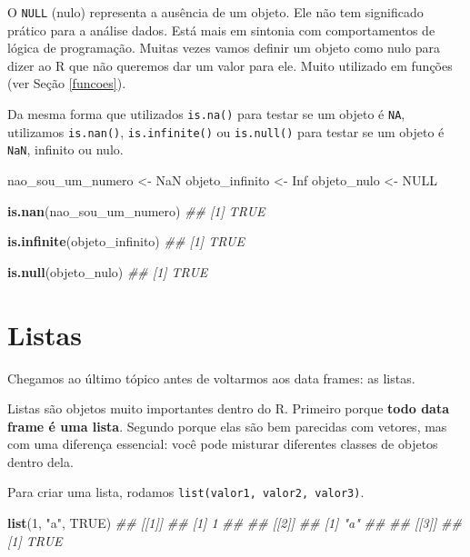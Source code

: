 \documentclass[]{book}
\newenvironment{Shaded}{\begin{snugshade}}{\end{snugshade}}
\newcommand{\CommentTok}[1]{\textcolor[rgb]{0.56,0.35,0.01}{\textit{#1}}}
\newcommand{\DecValTok}[1]{\textcolor[rgb]{0.00,0.00,0.81}{#1}}
\newcommand{\KeywordTok}[1]{\textcolor[rgb]{0.13,0.29,0.53}{\textbf{#1}}}
\newcommand{\NormalTok}[1]{#1}
\newcommand{\OtherTok}[1]{\textcolor[rgb]{0.56,0.35,0.01}{#1}}
\newcommand{\StringTok}[1]{\textcolor[rgb]{0.31,0.60,0.02}{#1}}
\begin{document}
O \texttt{NULL} (nulo) representa a ausência de um objeto. Ele não tem significado prático para a análise dados. Está mais em sintonia com comportamentos de lógica de programação. Muitas vezes vamos definir um objeto como nulo para dizer ao R que não queremos dar um valor para ele. Muito utilizado em funções (ver Seção \ref{funcoes}).

Da mesma forma que utilizados \texttt{is.na()} para testar se um objeto é \texttt{NA}, utilizamos \texttt{is.nan()}, \texttt{is.infinite()} ou \texttt{is.null()} para testar se um objeto é \texttt{NaN}, infinito ou nulo.

\begin{Shaded}
\begin{Highlighting}[]
\NormalTok{nao_sou_um_numero <-}\StringTok{ }\OtherTok{NaN}
\NormalTok{objeto_infinito <-}\StringTok{ }\OtherTok{Inf}
\NormalTok{objeto_nulo <-}\StringTok{ }\OtherTok{NULL}

\KeywordTok{is.nan}\NormalTok{(nao_sou_um_numero)}
\CommentTok{## [1] TRUE}

\KeywordTok{is.infinite}\NormalTok{(objeto_infinito)}
\CommentTok{## [1] TRUE}

\KeywordTok{is.null}\NormalTok{(objeto_nulo)}
\CommentTok{## [1] TRUE}
\end{Highlighting}
\end{Shaded}

\hypertarget{listas}{%
\section{Listas}\label{listas}}

Chegamos ao último tópico antes de voltarmos aos data frames: as listas.

Listas são objetos muito importantes dentro do R. Primeiro porque \textbf{todo data frame é uma lista}. Segundo porque elas são bem parecidas com vetores, mas com uma diferença essencial: você pode misturar diferentes classes de objetos dentro dela.

Para criar uma lista, rodamos \texttt{list(valor1,\ valor2,\ valor3)}.

\begin{Shaded}
\begin{Highlighting}[]
\KeywordTok{list}\NormalTok{(}\DecValTok{1}\NormalTok{, }\StringTok{"a"}\NormalTok{, }\OtherTok{TRUE}\NormalTok{)}
\CommentTok{## [[1]]}
\CommentTok{## [1] 1}
\CommentTok{## }
\CommentTok{## [[2]]}
\CommentTok{## [1] "a"}
\CommentTok{## }
\CommentTok{## [[3]]}
\CommentTok{## [1] TRUE}
\end{Highlighting}
\end{Shaded}
\end{document}
